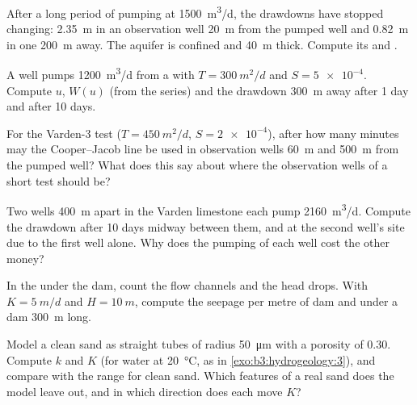 \begin{exercise}[$\star\star$]\label{exo:b3:hydrogeology:5}
After a long period of pumping at \qty{1500}{m^3/d}, the drawdowns have
stopped changing: \qty{2.35}{m} in an observation well \qty{20}{m} from the
pumped well and \qty{0.82}{m} in one \qty{200}{m} away. The aquifer is
confined and \qty{40}{m} thick. Compute its  and .
\end{exercise}

\begin{exercise}[$\star\star$]\label{exo:b3:hydrogeology:6}
A well pumps \qty{1200}{m^3/d} from a  with $T =
\qty{300}{m^2/d}$ and $S = \num{5e-4}$. Compute $u$, $W(u)$ (from the
series) and the drawdown \qty{300}{m} away after 1 day and after 10 days.
\end{exercise}

\begin{exercise}[$\star\star$]\label{exo:b3:hydrogeology:7}
For the Varden-3 test ($T = \qty{450}{m^2/d}$, $S = \num{2e-4}$), after
how many minutes may the Cooper--Jacob line be used in observation wells
\qty{60}{m} and \qty{500}{m} from the pumped well? What does this say
about where the observation wells of a short test should be?
\end{exercise}

\begin{exercise}[$\star\star$]\label{exo:b3:hydrogeology:8}
Two wells \qty{400}{m} apart in the Varden limestone each pump
\qty{2160}{m^3/d}. Compute the drawdown after 10 days midway between them,
and at the second well's site due to the first well alone. Why does the
pumping of each well cost the other money?
\end{exercise}

\begin{exercise}[$\star\star$]\label{exo:b3:hydrogeology:9}
In the  under the dam, count the flow channels and the head drops.
With $K = \qty{5}{m/d}$ and $H = \qty{10}{m}$, compute the seepage per
metre of dam and under a dam \qty{300}{m} long.
\end{exercise}

\begin{exercise}[$\star\star\star$]\label{exo:b3:hydrogeology:10}
Model a clean sand as straight tubes of radius \qty{50}{\micro\metre} with a
porosity of 0.30. Compute $k$ and $K$ (for water at \qty{20}{\celsius}, as in
\cref{exo:b3:hydrogeology:3}),
and compare with the range for clean sand. Which features of a real sand
does the model leave out, and in which direction does each move $K$?
\end{exercise}

